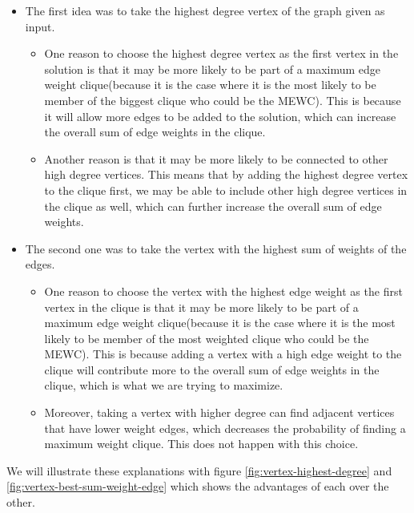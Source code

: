 \begin{itemize}
    \item The first idea was to take the highest degree vertex of the graph given as input.
          \begin{itemize}
              \item One reason to choose the highest degree vertex as the first vertex in the solution is that it may be more likely to be part of a maximum edge weight clique(because it is the case where it is the most likely to be member of the biggest clique who could be the MEWC). This is because it will allow more edges to be added to the solution, which can increase the overall sum of edge weights in the clique.
              \item Another reason is that it may be more likely to be connected to other high degree vertices. This means that by adding the highest degree vertex to the clique first, we may be able to include other high degree vertices in the clique as well, which can further increase the overall sum of edge weights.
          \end{itemize}
    \item The second one was to take the vertex with the highest sum of weights of the edges.
          \begin{itemize}
              \item One reason to choose the vertex with the highest edge weight as the first vertex in the clique is that it may be more likely to be part of a maximum edge weight clique(because it is the case where it is the most likely to be member of the most weighted clique who could be the MEWC). This is because adding a vertex with a high edge weight to the clique will contribute more to the overall sum of edge weights in the clique, which is what we are trying to maximize.
              \item Moreover, taking a vertex with higher degree can find adjacent vertices that have lower weight edges, which decreases the probability of finding a maximum weight clique. This does not happen with this choice.
          \end{itemize}
\end{itemize}

\vspace{1\baselineskip}

We will illustrate these explanations with figure \ref{fig:vertex-highest-degree} and \ref{fig:vertex-best-sum-weight-edge} which shows the advantages of each over the other.
\bigskip

